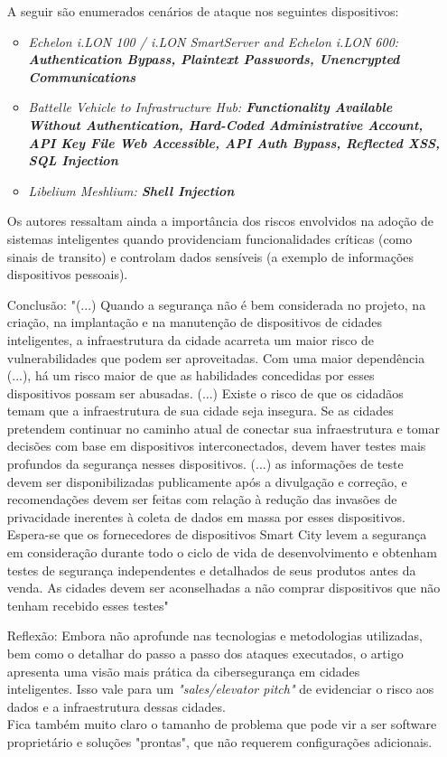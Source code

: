 \documentclass[letterpaper,11pt]{texMemo} %
\begin{document}
\begin{itemize}
	A seguir são enumerados cenários de ataque nos seguintes dispositivos:
	\begin{itemize}
		\item \textit{Echelon i.LON 100 / i.LON SmartServer and Echelon i.LON 600: \textbf{Authentication Bypass, Plaintext Passwords, Unencrypted Communications}}
		\item \textit{Battelle Vehicle to Infrastructure Hub: \textbf{Functionality Available Without Authentication, Hard-Coded Administrative Account, API Key File Web Accessible, API Auth Bypass, Reflected XSS, SQL Injection}}
		\item \textit{Libelium Meshlium: \textbf{Shell Injection}}
	\end{itemize}
	Os autores ressaltam ainda a importância dos riscos envolvidos na adoção de sistemas inteligentes quando providenciam funcionalidades críticas (como sinais de transito) e controlam dados sensíveis (a exemplo de informações dispositivos pessoais).
	\item[Conclusão:] "(...) Quando a segurança não é bem considerada no projeto, na criação, na implantação e na manutenção de dispositivos de cidades inteligentes, a infraestrutura da cidade acarreta um maior risco de vulnerabilidades que podem ser aproveitadas. Com uma maior dependência (...), há um risco maior de que as habilidades concedidas por esses dispositivos possam ser abusadas. (...) Existe o risco de que os cidadãos temam que a infraestrutura de sua cidade seja insegura. Se as cidades pretendem continuar no caminho atual de conectar sua infraestrutura e tomar decisões com base em dispositivos interconectados, devem haver testes mais profundos da segurança nesses dispositivos. (...) as informações de teste devem ser disponibilizadas publicamente após a divulgação e correção, e recomendações devem ser feitas com relação à redução das invasões de privacidade inerentes à coleta de dados em massa por esses dispositivos. Espera-se que os fornecedores de dispositivos Smart City levem a segurança em consideração durante todo o ciclo de vida de desenvolvimento e obtenham testes de segurança independentes e detalhados de seus produtos antes da venda. As cidades devem ser aconselhadas a não comprar dispositivos que não tenham recebido esses testes"
	\item[Reflexão:] Embora não aprofunde nas tecnologias e metodologias utilizadas, bem como o detalhar do passo a passo dos ataques executados, o artigo apresenta uma visão mais prática da cibersegurança em cidades\\
	 inteligentes. Isso vale para um \textit{"sales/elevator pitch"} de evidenciar o risco aos dados e a infraestrutura dessas cidades.\\
	 Fica também muito claro o tamanho de problema que pode vir a ser software proprietário e soluções "prontas", que não requerem configurações adicionais.
\end{itemize}

\end{document}
